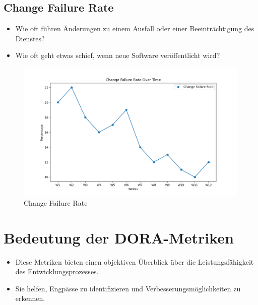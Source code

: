 \documentclass{orgstandard}
\begin{document}
\subsection{Change Failure Rate}
\label{sec:org7c5ee15}
\begin{itemize}
\item Wie oft führen Änderungen zu einem Ausfall oder einer Beeinträchtigung des Dienstes?
\item Wie oft geht etwas schief, wenn neue Software veröffentlicht wird?
\end{itemize}
\begin{figure}[htbp]
\centering
\includegraphics[width=.65\linewidth]{img/ChangeFailureRate.png}
\caption{\label{fig:org2c1d94b}Change Failure Rate}
\end{figure}

\section{Bedeutung der DORA-Metriken}
\label{sec:orgf74cefb}
\begin{itemize}
\item Diese Metriken bieten einen objektiven Überblick über die Leistungsfähigkeit des Entwicklungsprozesses.
\item Sie helfen, Engpässe zu identifizieren und Verbesserungsmöglichkeiten zu erkennen.
\end{itemize}
\end{document}
